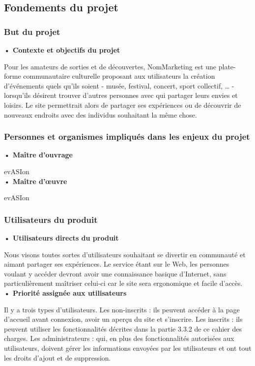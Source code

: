 \subsection{Fondements du projet}

\subsubsection{But du projet}

\textbf{• Contexte et objectifs du projet}

Pour les amateurs de sorties et de découvertes, NomMarketing est une plate-forme communautaire culturelle proposant aux utilisateurs la création d’événements quels qu’ils soient - musée, festival, concert, sport collectif, … - lorsqu’ils désirent trouver d’autres personnes avec qui partager leurs envies et loisirs. Le site permettrait alors de partager ses expériences ou de découvrir de nouveaux endroits avec des individus souhaitant la même chose.

\subsubsection{Personnes et organismes impliqués dans les enjeux du projet}

\textbf{• Maître d’ouvrage}

evASIon \\
    
\textbf{• Maître d’œuvre}

evASIon

\subsubsection{Utilisateurs du produit}

\textbf{• Utilisateurs directs du produit}

Nous visons toutes sortes d’utilisateurs souhaitant se divertir en communauté et aimant partager ses expériences. Le service étant sur le Web, les personnes voulant y accéder devront avoir une connaissance basique d’Internet, sans particulièrement maîtriser celui-ci car le site sera ergonomique et facile d’accès. \\

\textbf{• Priorité assignée aux utilisateurs}

Il y a trois types d’utilisateurs. Les non-inscrits : ils peuvent accéder à la page d'accueil avant connexion, avoir un aperçu du site et s'inscrire. Les inscrits : ils peuvent utiliser les fonctionnalités décrites dans la partie 3.3.2 de ce cahier des charges. Les administrateurs : qui, en plus des fonctionnalités autorisées aux utilisateurs, doivent gérer les informations envoyées par les utilisateurs et ont tout les droits d'ajout et de suppression. \\

